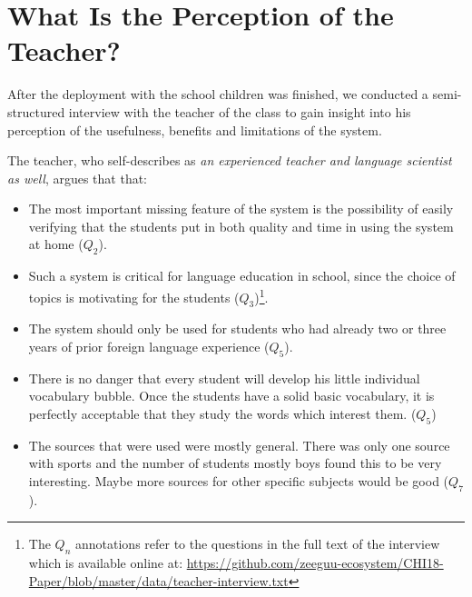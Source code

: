 
\newcommand{\q}[1]{($Q_#1$)}

\section{What Is the Perception of the Teacher?}
After the deployment with the school children was finished, we conducted a semi-structured interview with the teacher of the class to gain insight into his perception of the usefulness, benefits and limitations of the system. 

The teacher, who self-describes as {\em an experienced teacher and language scientist as well}, argues that that: 

\begin{itemize}

	\item The most important missing feature of the system is the possibility of easily verifying that the students put in both quality and time in using the system at home \q{2}.

	\item Such a system is critical for language education in school, since the choice of topics is motivating for the students \q{3}\footnote{The $Q_n$ annotations refer to the questions in the full text of the interview which is available online at: \url{https://github.com/zeeguu-ecosystem/CHI18-Paper/blob/master/data/teacher-interview.txt}}. 

	\item The system should only be used for students who had already two or three years of prior foreign language experience \q{5}. 

	\item There is no danger that every student will develop his little individual vocabulary bubble. Once the students have a solid basic vocabulary, it is perfectly acceptable that they study the words which interest them. \q{5}

	\item The sources that were used were mostly general. There was only one source with sports and the number of students mostly boys found this to be very interesting. Maybe more sources for other specific subjects would be good \q{7}.




\end{itemize}
